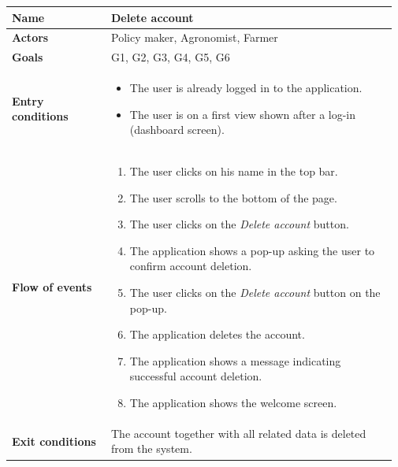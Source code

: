 \begin{longtable}{@{}p{0.25\linewidth} p{0.72\linewidth}@{}}
\toprule
	\textbf{Name}               & Delete account\\
	\midrule
	\textbf{Actors}             & Policy maker, Agronomist, Farmer\\
	\midrule
	\textbf{Goals}              & G1, G2, G3, G4, G5, G6 \\
	\midrule
	
	\textbf{Entry conditions}   & \begin{itemize}[leftmargin=.4cm,noitemsep,topsep=0pt,before=\vspace{-3mm},after=\vspace{-4mm}]
	    \item The user is already logged in to the application.
	    \item The user is on a first view shown after a log-in (dashboard screen).
	\end{itemize}\\
	\midrule
	
	\textbf{Flow of events}     & \begin{enumerate}[leftmargin=.4cm,noitemsep,topsep=0pt,before=\vspace{-3mm},after=\vspace{-4mm}]
	    \item The user clicks on his name in the top bar.
	    \item The user scrolls to the bottom of the page.
	    \item The user clicks on the \textit{Delete account} button.
	    \item The application shows a pop-up asking the user to confirm account deletion.
	    \item The user clicks on the \textit{Delete account} button on the pop-up.
	    \item The application deletes the account.
	    \item The application shows a message indicating successful account deletion.
	    \item The application shows the welcome screen.
	\end{enumerate}\\
	\midrule
	\textbf{Exit conditions}    & The account together with all related data is deleted from the system. \\
	\midrule
	

\end{longtable}
